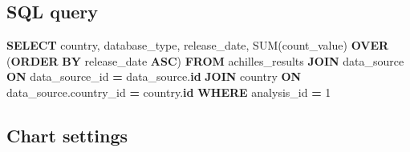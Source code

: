 \documentclass[
]{book}
\newenvironment{Shaded}{\begin{snugshade}}{\end{snugshade}}
\newcommand{\DecValTok}[1]{\textcolor[rgb]{0.00,0.00,0.81}{#1}}
\newcommand{\FunctionTok}[1]{\textcolor[rgb]{0.00,0.00,0.00}{#1}}
\newcommand{\KeywordTok}[1]{\textcolor[rgb]{0.13,0.29,0.53}{\textbf{#1}}}
\newcommand{\NormalTok}[1]{#1}
\newcommand{\OperatorTok}[1]{\textcolor[rgb]{0.81,0.36,0.00}{\textbf{#1}}}
\begin{document}
\hypertarget{sql-query-1}{%
\subsection{SQL query}\label{sql-query-1}}

\begin{Shaded}
\begin{Highlighting}[]
\KeywordTok{SELECT}
\NormalTok{ country,}
\NormalTok{ database\_type,}
\NormalTok{ release\_date,}
 \FunctionTok{SUM}\NormalTok{(count\_value) }\KeywordTok{OVER}\NormalTok{ (}\KeywordTok{ORDER} \KeywordTok{BY}\NormalTok{ release\_date }\KeywordTok{ASC}\NormalTok{)}
\KeywordTok{FROM}\NormalTok{ achilles\_results}
\KeywordTok{JOIN}\NormalTok{ data\_source }\KeywordTok{ON}\NormalTok{ data\_source\_id }\OperatorTok{=}\NormalTok{ data\_source.}\KeywordTok{id}
\KeywordTok{JOIN}\NormalTok{ country }\KeywordTok{ON}\NormalTok{ data\_source.country\_id }\OperatorTok{=}\NormalTok{ country.}\KeywordTok{id}
\KeywordTok{WHERE}\NormalTok{ analysis\_id }\OperatorTok{=} \DecValTok{1}
\end{Highlighting}
\end{Shaded}

\hypertarget{chart-settings-1}{%
\subsection{Chart settings}\label{chart-settings-1}}
\end{document}
